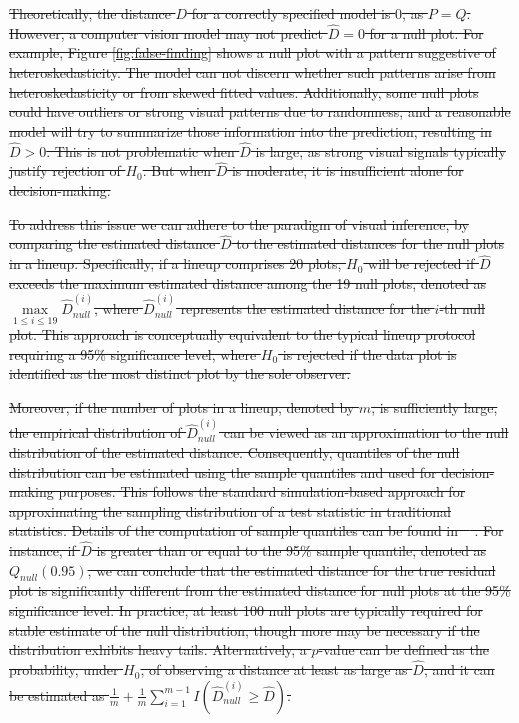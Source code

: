\documentclass[]{interact}
\theoremstyle{plain}%
\theoremstyle{definition}
\theoremstyle{remark}
\providecommand{\DIFdeltex}[1]{{\protect\color{red}\sout{#1}}}                      %
\providecommand{\DIFdel}[1]{\texorpdfstring{\DIFdeltex{#1}}{}} %
\begin{document}
\DIFdel{Theoretically, the distance \(D\) for a correctly specified model is
\(0\), as \(P = Q\). However, a computer vision model may not predict
\(\hat{D} = 0\) for a null plot. For example, Figure
\ref{fig:false-finding} shows a null plot with a pattern suggestive of heteroskedasticity. The model can not discern whether such patterns
arise from heteroskedasticity or from skewed fitted values.
Additionally, some null plots could have outliers or strong visual
patterns due to randomness, and a reasonable model will try to summarize
those information into the prediction, resulting in \(\hat{D} > 0\).
This is not problematic when \(\hat{D}\) is large, as strong visual
signals typically justify rejection of \(H_0\). But when \(\hat{D}\) is
moderate, it is insufficient alone for decision-making.
}%

\DIFdel{To address this issue we can adhere to the paradigm of visual inference,
by comparing the estimated distance \(\hat{D}\) to the estimated
distances for the null plots in a lineup. Specifically, if a lineup
comprises 20 plots, \(H_0\) will be rejected if \(\hat{D}\) exceeds the
maximum estimated distance among the 19 null plots, denoted as
\(\max\limits_{1 \leq i \leq 19} {\hat{D}_{null}^{(i)}}\), where
\(\hat{D}_{null}^{(i)}\) represents the estimated distance for the
\(i\)-th null plot.
This approach is conceptually equivalent to the
typical lineup protocol requiring a 95\% significance level, where
\(H_0\) is rejected if the data plot is identified as the most distinct
plot by the sole observer.
}%

\DIFdel{Moreover, if the number of plots in a lineup, denoted by \(m\), is
sufficiently large, the empirical distribution of
\(\hat{D}_{null}^{(i)}\) can be viewed as an approximation to the null
distribution of the estimated distance. Consequently, quantiles of the
null distribution can be estimated using the sample quantiles and used
for decision-making purposes. This follows the standard simulation-based
approach for approximating the sampling distribution of a test statistic
in traditional statistics. Details of the computation of sample
quantiles can be found in \mbox{%
\citet{hyndman1996sample}}\hskip0pt%
. For instance, if
\(\hat{D}\) is greater than or equal to the 95\% sample quantile,
denoted as \(Q_{null}(0.95)\), we can conclude that the estimated
distance for the true residual plot is significantly different from the
estimated distance for null plots at the 95\% significance level. In
practice, at least 100 null plots are typically required for stable
estimate of the null distribution, though more may be necessary if the
distribution exhibits heavy tails. Alternatively, a \(p\)-value can be
defined as the probability, under \(H_0\), of observing a distance at
least as large as \(\hat{D}\), and it can be estimated as
\(\frac{1}{m} + \frac{1}{m}\sum_{i=1}^{m-1}I\left(\hat{D}_{null}^{(i)} \geq \hat{D}\right)\).
}%
\end{document}
